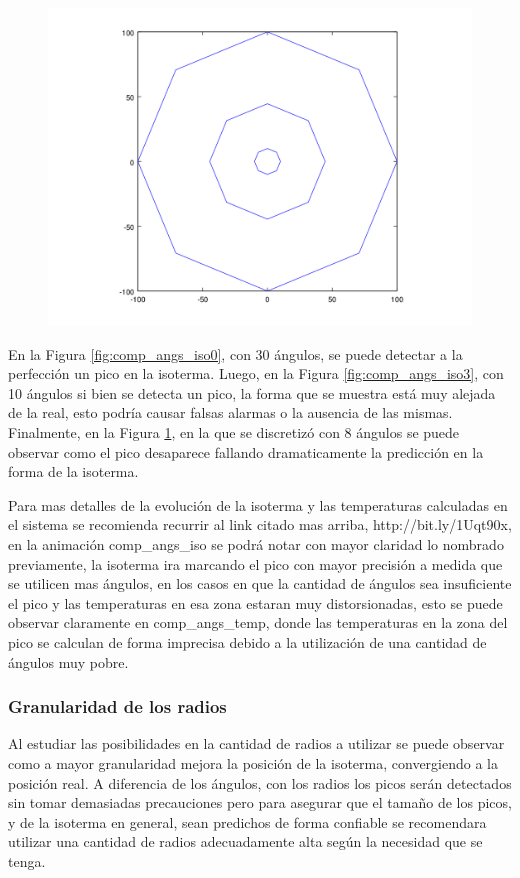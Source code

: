 \begin{figure}[H]
\begin{minipage}{0.30\textwidth}
  \centering
    \includegraphics[width=1\textwidth]{imgs/comp_angulos/comp_angs_iso4.png} 
  \caption{}
  \label{fig:comp_angs_iso4}
\end{minipage}

\end{figure}

En la Figura \ref{fig:comp_angs_iso0}, con 30 ángulos, se puede detectar a la perfección un pico en la isoterma. Luego, en la Figura \ref{fig:comp_angs_iso3}, con 10 ángulos si bien se detecta un pico, la forma que se muestra está muy alejada de la real, esto podría causar falsas alarmas o la ausencia de las mismas.
Finalmente, en la Figura \ref{fig:comp_angs_iso4}, en la que se discretizó con 8 ángulos se puede observar como el pico desaparece fallando dramaticamente la predicción en la forma de la isoterma.

Para mas detalles de la evolución de la isoterma y las temperaturas calculadas en el sistema se recomienda recurrir al link citado mas arriba, http://bit.ly/1Uqt90x, en la animación comp\_angs\_iso se podrá notar con mayor claridad lo nombrado previamente, la isoterma ira marcando el pico con mayor precisión a medida que se utilicen mas ángulos, en los casos en que la cantidad de ángulos sea insuficiente el pico y las temperaturas en esa zona estaran muy distorsionadas, esto se puede observar claramente en comp\_angs\_temp, donde las temperaturas en la zona del pico se calculan de forma imprecisa debido a la utilización de una cantidad de ángulos muy pobre.


\subsubsection{Granularidad de los radios}
Al estudiar las posibilidades en la cantidad de radios a utilizar se puede observar como a mayor granularidad mejora la posición de la isoterma, convergiendo a la posición real. A diferencia de los ángulos, con los radios los picos serán detectados sin tomar demasiadas precauciones pero para asegurar que el tamaño de los picos, y de la isoterma en general, sean predichos de forma confiable se recomendara utilizar una cantidad de radios adecuadamente alta según la necesidad que se tenga.

